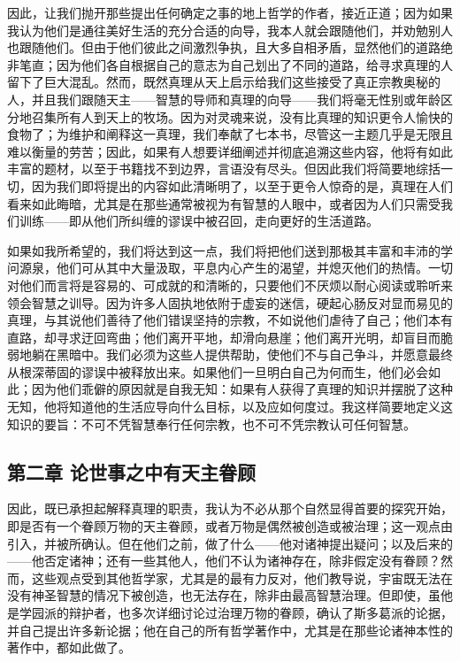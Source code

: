 因此，让我们抛开那些提出任何确定之事的地上哲学的作者，接近正道；因为如果我认为他们是通往美好生活的充分合适的向导，我本人就会跟随他们，并劝勉别人也跟随他们。但由于他们彼此之间激烈争执，且大多自相矛盾，显然他们的道路绝非笔直；因为他们各自根据自己的意志为自己划出了不同的道路，给寻求真理的人留下了巨大混乱。然而，既然真理从天上启示给我们这些接受了真正宗教奥秘的人，并且我们跟随天主——智慧的导师和真理的向导——我们将毫无性别或年龄区分地召集所有人到天上的牧场。因为对灵魂来说，没有比真理的知识更令人愉快的食物了；为维护和阐释这一真理，我们奉献了七本书，尽管这一主题几乎是无限且难以衡量的劳苦；因此，如果有人想要详细阐述并彻底追溯这些内容，他将有如此丰富的题材，以至于书籍找不到边界，言语没有尽头。但因此我们将简要地综括一切，因为我们即将提出的内容如此清晰明了，以至于更令人惊奇的是，真理在人们看来如此晦暗，尤其是在那些通常被视为有智慧的人眼中，或者因为人们只需受我们训练——即从他们所纠缠的谬误中被召回，走向更好的生活道路。\par

如果如我所希望的，我们将达到这一点，我们将把他们送到那极其丰富和丰沛的学问源泉，他们可从其中大量汲取，平息内心产生的渴望，并熄灭他们的热情。一切对他们而言将是容易的、可成就的和清晰的，只要他们不厌烦以耐心阅读或聆听来领会智慧之训导。因为许多人固执地依附于虚妄的迷信，硬起心肠反对显而易见的真理，与其说他们善待了他们错误坚持的宗教，不如说他们虐待了自己；他们本有直路，却寻求迂回弯曲；他们离开平地，却滑向悬崖；他们离开光明，却盲目而脆弱地躺在黑暗中。我们必须为这些人提供帮助，使他们不与自己争斗，并愿意最终从根深蒂固的谬误中被释放出来。如果他们一旦明白自己为何而生，他们必会如此；因为他们乖僻的原因就是自我无知：如果有人获得了真理的知识并摆脱了这种无知，他将知道他的生活应导向什么目标，以及应如何度过。我这样简要地定义这知识的要旨：不可不凭智慧奉行任何宗教，也不可不凭宗教认可任何智慧。\par


\subsection{第二章 论世事之中有天主眷顾}

因此，既已承担起解释真理的职责，我认为不必从那个自然显得首要的探究开始，即是否有一个眷顾万物的天主眷顾，或者万物是偶然被创造或被治理；这一观点由引入，并被所确认。但在他们之前，做了什么——他对诸神提出疑问；以及后来的——他否定诸神；还有一些其他人，他们不认为诸神存在，除非假定没有眷顾？然而，这些观点受到其他哲学家，尤其是的最有力反对，他们教导说，宇宙既无法在没有神圣智慧的情况下被创造，也无法存在，除非由最高智慧治理。但即使，虽他是学园派的辩护者，也多次详细讨论过治理万物的眷顾，确认了斯多葛派的论据，并自己提出许多新论据；他在自己的所有哲学著作中，尤其是在那些论诸神本性的著作中，都如此做了。\par

